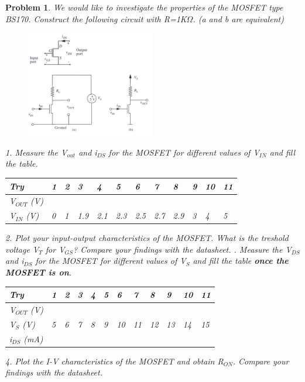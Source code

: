 \documentclass[11pt,a4paper,notitlepage]{article}
\theoremstyle{plain}
\newtheorem{problem}{Problem}[section]
\theoremstyle{remark}
\begin{document}
{{{{	\begin{problem}
		We would like to investigate the properties of the MOSFET type BS170. Construct the following circuit with R=1K\(\Omega\). (a and b are equivalent)
		\begin{figure}[h!]
			\centering
			\includegraphics[width=0.5\textwidth]{images/circuit4.png}
		\end{figure}
		1. Measure the V\(_{out}\) and i\(_{DS}\) for the MOSFET for different values of V\(_{IN}\) and fill the table.
		\begin{table}[h]
			\begin{tabular}{| l | l | l | l | l | l | l | l | l | l | l | l |}
				\hline
				Try & 1 & 2 & 3 & 4 & 5 & 6 & 7 & 8 & 9 & 10 & 11 \\ \hline
				V$_{OUT}$ (V) & & & & & & & & & & & \\ \hline
				V$_{IN}$ (V) & 0 & 1 & 1.9 & 2.1 & 2.3 & 2.5 & 2.7 & 2.9 & 3 & 4 & 5 \\ \hline
			\end{tabular}
		\end{table}
		2. Plot your input-output characteristics of the MOSFET. What is the treshold voltage V\(_{T}\) for V\(_{GS}\)? Compare your findings with the datasheet.
		. Measure the V\(_{DS}\) and i\(_{DS}\) for the MOSFET for different values of V\(_{S}\) and fill the table \textbf{once the MOSFET is on}.
		\begin{table}[h]
			\begin{tabular}{| l | l | l | l | l | l | l | l | l | l | l | l |}
				\hline
				Try & 1 & 2 & 3 & 4 & 5 & 6 & 7 & 8 & 9 & 10 & 11 \\ \hline
				V$_{OUT}$ (V) & & & & & & & & & & & \\ \hline
				V$_{S}$ (V) & 5 & 6 & 7 & 8 & 9 & 10 & 11 & 12 & 13 & 14 & 15 \\ \hline
				i$_{DS}$ (mA) & & & & & & & & & & & \\ \hline
			\end{tabular}
		\end{table}
		4. Plot the I-V characteristics of the MOSFET and obtain R\(_{ON}\). Compare your findings with the datasheet.
	\end{problem}
	
}}}}
\end{document}
